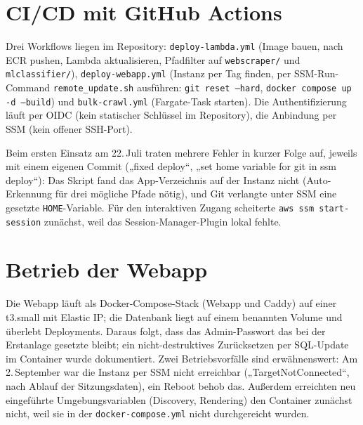 \section{CI/CD mit GitHub Actions}
Drei Workflows liegen im Repository: \texttt{deploy-lambda.yml} (Image bauen, nach ECR pushen, Lambda aktualisieren, Pfadfilter auf \texttt{webscraper/} und \texttt{mlclassifier/}), \texttt{deploy-webapp.yml} (Instanz per Tag finden, per SSM-Run-Command \texttt{remote\_update.sh} ausführen: \texttt{git reset --hard}, \texttt{docker compose up -d --build}) und \texttt{bulk-crawl.yml} (Fargate-Task starten). Die Authentifizierung läuft per OIDC (kein statischer Schlüssel im Repository), die Anbindung per SSM (kein offener SSH-Port).

Beim ersten Einsatz am 22.\,Juli traten mehrere Fehler in kurzer Folge auf, jeweils mit einem eigenen Commit („fixed deploy“, „set home variable for git in ssm deploy“): Das Skript fand das App-Verzeichnis auf der Instanz nicht (Auto-Erkennung für drei mögliche Pfade nötig), und Git verlangte unter SSM eine gesetzte \texttt{HOME}-Variable. Für den interaktiven Zugang scheiterte \texttt{aws ssm start-session} zunächst, weil das Session-Manager-Plugin lokal fehlte.

\section{Betrieb der Webapp}
Die Webapp läuft als Docker-Compose-Stack (Webapp und Caddy) auf einer t3.small mit Elastic IP; die Datenbank liegt auf einem benannten Volume und überlebt Deployments. Daraus folgt, dass das Admin-Passwort das bei der Erstanlage gesetzte bleibt; ein nicht-destruktives Zurücksetzen per SQL-Update im Container wurde dokumentiert. Zwei Betriebsvorfälle sind erwähnenswert: Am 2.\,September war die Instanz per SSM nicht erreichbar („TargetNotConnected“, nach Ablauf der Sitzungsdaten), ein Reboot behob das. Außerdem erreichten neu eingeführte Umgebungsvariablen (Discovery, Rendering) den Container zunächst nicht, weil sie in der \texttt{docker-compose.yml} nicht durchgereicht wurden.

